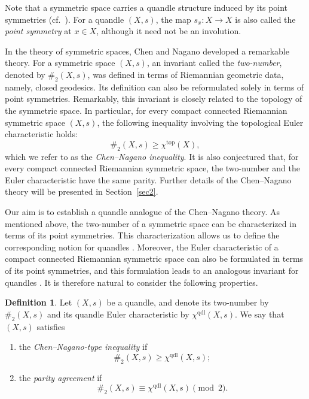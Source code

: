 \documentclass[12pt]{amsart}
\theoremstyle{definition}
\newtheorem{Def}[Prop]{Definition}
\begin{document}
Note that a symmetric space carries a quandle structure induced by its point symmetries 
(cf.~\cite{Helgason, Loos}). 
For a quandle $(X,s)$, the map 
$s_x \colon X \to X$ 
is also called the \textit{point symmetry} at $x \in X$, although it need not be an involution.


In the theory of symmetric spaces, 
Chen and Nagano developed a remarkable theory. 
For a symmetric space $(X,s)$, 
an invariant called the \textit{two-number}, denoted by $\#_2(X,s)$,
was defined in terms of Riemannian geometric data, namely, closed geodesics. 
Its definition can also be reformulated solely in terms of point symmetries. 
Remarkably, this invariant is closely related to the topology of the symmetric space.
In particular, for every compact connected Riemannian symmetric space $(X,s)$,
the following inequality involving the topological Euler characteristic holds:
\[
\#_2(X,s) \geq \chi^{\mathrm{top}}(X),
\]
which we refer to as the \textit{Chen--Nagano inequality}.
It is also conjectured that, for every compact connected Riemannian symmetric space,
the two-number and the Euler characteristic have the same parity.
Further details of the Chen--Nagano theory will be presented in Section~\ref{sec2}.


Our aim is to establish a quandle analogue of the Chen--Nagano theory.
As mentioned above,
the two-number of a symmetric space can be characterized in terms of its point symmetries.
This characterization allows us to define the corresponding notion for quandles \cite{KNOT}.
Moreover, the Euler characteristic of a compact connected Riemannian symmetric space
can also be formulated in terms of its point symmetries,
and this formulation leads to an analogous invariant for quandles \cite{KT}.
It is therefore natural to consider the following properties.

\begin{Def}
\label{def:0822}
Let $(X,s)$ be a quandle,
and denote its two-number by $\#_2(X,s)$
and its quandle Euler characteristic by $\chi^{\mathrm{qdl}}(X,s)$.
We say that $(X,s)$ satisfies
\begin{enumerate}
\item
the \textit{Chen--Nagano-type inequality} if
\[
\#_2(X,s) \geq \chi^{\mathrm{qdl}}(X,s);
\]
\item
the \textit{parity agreement} if
\[
\#_2(X,s) \equiv \chi^{\mathrm{qdl}}(X,s) \pmod{2}.
\]
\end{enumerate}
\end{Def}
\end{document}

